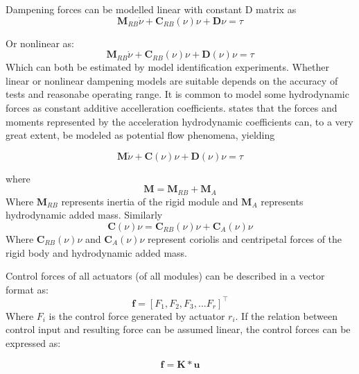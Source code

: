 Dampening forces can be modelled linear with constant D matrix as 
\begin{equation}
\textbf{M}_{RB} \dot{\nu} + \textbf{C}_{RB}(\nu)\nu  + \textbf{D}\nu = \tau
\label{eq:fossen1994RigidBodyKineticsinclDampeningLinear}
\end{equation}


Or nonlinear as: 
\begin{equation}
\textbf{M}_{RB} \dot{\nu} + \textbf{C}_{RB}(\nu)\nu  + \textbf{D}(\nu)\nu = \tau
\label{eq:fossen1994RigidBodyKineticsinclDampeningNonLinear}
\end{equation}
Which can both be estimated by model identification experiments. Whether linear or nonlinear dampening models are suitable depends on the accuracy of tests and reasonabe operating range. It is common to model some hydrodynamic forces as constant additive accelleration coefficients. \citet{humphreys1978prediction} states that the forces and moments represented by the acceleration hydrodynamic coefficients can, to a very great extent, be modeled as potential flow phenomena, yielding 

\begin{equation}
\textbf{M} \dot{\nu} + \textbf{C}(\nu)\nu  + \textbf{D}(\nu)\nu = \tau{}
\label{eq:fossen1994RigidBodyKineticsinclAddedMass}
\end{equation}

where
\begin{equation}
\textbf{M} = \textbf{M}_{RB} + \textbf{M}_{A}
\end{equation}
Where $ \textbf{M}_{RB} $ represents inertia of the rigid module and $\textbf{M}_{A}$ represents hydrodynamic added mass. Similarly
\begin{equation}
\textbf{C}(\nu)\nu = \textbf{C}_{RB}(\nu)\nu + \textbf{C}_{A}(\nu)\nu
\end{equation}
Where $ \textbf{C}_{RB}(\nu)\nu $ and $\textbf{C}_{A}(\nu)\nu$ represent coriolis and centripetal forces of the rigid body and hydrodynamic added mass. 

Control forces of all actuators (of all modules) can be described in a vector format as:
\begin{equation}
\textbf{f} = [F_{1},F_{2},F_{3}, ... F_{r}]^\top
\end{equation}
Where $F_i$ is the control force generated by actuator $r_i$. 
If the relation between control input and resulting force can be assumed linear, the control forces can be expressed as:

\begin{equation}
\textbf{f} = \textbf{K} * \textbf{u}
\end{equation}

